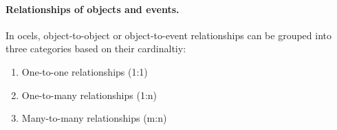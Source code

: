 \paragraph{Relationships of objects and events.} In \acp{ocel}, object-to-object or object-to-event relationships can be grouped into three categories based on their cardinaltiy:

\begin{enumerate}
	\item One-to-one relationships (1:1)
	\item One-to-many relationships (1:n)
	\item Many-to-many relationships (m:n)
\end{enumerate}

